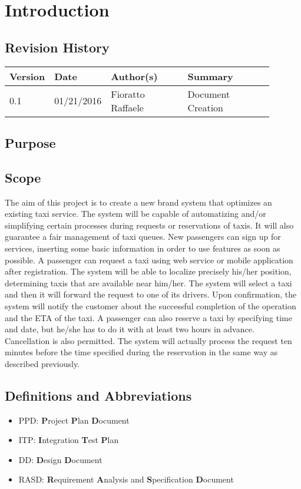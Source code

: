 \newpage
\section{Introduction}
\subsection{Revision History}
\begin{table}[H]
	\centering
	\begin{tabular*}{\linewidth}{|p{0.1\linewidth}|p{0.13\linewidth}|p{0.3099\linewidth}|p{0.3499\linewidth}|}
		\hline
		\textbf{Version} & \textbf{Date}       & \textbf{Author(s)}         & \textbf{Summary}           \\ \hline
		0.1     & 01/21/2016 & Fioratto Raffaele & Document Creation \\ \hline
	\end{tabular*}
\end{table}
\break
\subsection{Purpose}
\subsection{Scope}
The aim of this project is to create a new brand system that optimizes an 
existing taxi service.
The system will be capable of automatizing and/or simplifying certain 
processes during requests or reservations of taxis.
It will also guarantee a fair management of taxi queues.
New passengers can sign up for services, inserting some basic information in order to use features as soon as possible.
A passenger can request a taxi using web service or mobile
application after registration. The system will be able to localize precisely his/her position, determining taxis that are available near
him/her. The system will select a taxi and then it will forward the request to one of its drivers.
Upon confirmation, the system will notify the customer about the successful completion of the operation and the ETA of the taxi. A passenger can also reserve a taxi by specifying time and date, but he/she has to do it with at least two hours in advance. Cancellation is also permitted. The system will actually process the request ten minutes before the time specified during the reservation in the same way as described previously.
\subsection{Definitions and Abbreviations}
\begin{itemize}
	\item PPD: \textbf{P}roject \textbf{P}lan \textbf{D}ocument
	\item ITP: \textbf{I}ntegration \textbf{T}est \textbf{P}lan
	\item DD: \textbf{D}esign \textbf{D}ocument
	\item RASD: \textbf{R}equirement \textbf{A}nalysis and \textbf{S}pecification \textbf{D}ocument
\end{itemize}
